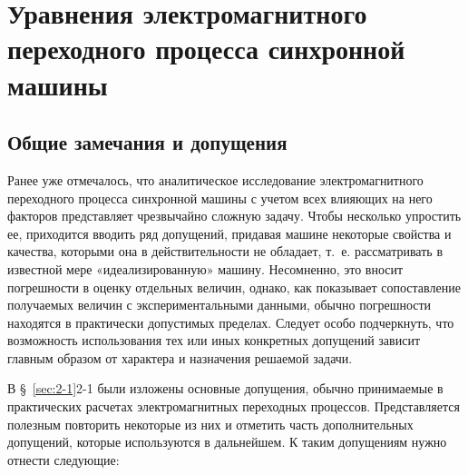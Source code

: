 \chapter{Уравнения электромагнитного переходного процесса синхронной машины}
\label{chap:7}

\section{Общие замечания и допущения}
\label{sec:7-1}

Ранее уже отмечалось, что аналитическое исследование электромагнитного переходного процесса синхронной машины с учетом всех влияющих на него факторов представляет чрезвычайно сложную задачу. Чтобы несколько упростить ее, приходится вводить ряд допущений, придавая машине некоторые свойства и качества, которыми она в действительности не обладает, т.~е. рассматривать в известной мере «идеализированную» машину. Несомненно, это вносит погрешности в оценку отдельных величин, однако, как показывает сопоставление получаемых величин с экспериментальными данными, обычно погрешности находятся в практически допустимых пределах. Следует особо подчеркнуть, что возможность использования тех или иных конкретных допущений зависит главным образом от характера и назначения решаемой задачи.

В §~\ref{sec:2-1}{2-1} были изложены основные допущения, обычно принимаемые в практических расчетах электромагнитных переходных процессов. Представляется полезным повторить некоторые из них и отметить часть дополнительных допущений, которые используются в дальнейшем. К таким допущениям нужно отнести следующие:

